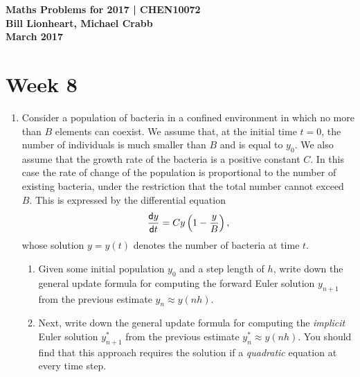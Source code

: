 \documentclass[11pt,a4paper]{article}
\newcommand{\dif}{\mathsf{d}}
\begin{document}
\begin{center} 
{\bf Maths Problems for 2017 | CHEN10072 \\
Bill Lionheart, Michael Crabb\\
 March 2017}
\end{center}

\section*{Week 8}

 \begin{enumerate}
\item \label{qdjsode1}
 Consider a population of bacteria in a confined environment in which no more than 
 $B$ elements can coexist. We assume that, at the initial time $t=0$, the number of individuals
 is  much smaller than $B$ and is equal to $y_0$. We also assume that
 the growth rate of the bacteria is a positive constant  $C$.
 In this case the rate of change of the population is proportional to the number
 of existing bacteria, under the restriction that the total number cannot exceed
 $B$. This is expressed by the differential equation 
 $${\dif y\over \dif t} = Cy \left( 1-{y\over B}\right),$$
 whose solution $y=y(t)$ denotes the number of bacteria at time $t$.
 
 \begin{enumerate}
\item 
Given some initial population $y_0$ and a  step length of $h$,
write down the general update formula for computing the forward Euler 
solution  $y_{n+1}$  from the previous estimate $y_n\approx y(nh)$.
\item 
Next, write down the general update formula for computing the {\it implicit} Euler 
solution  $y^*_{n+1}$  from the previous estimate $y^*_n \approx y(nh)$.
You should find that this approach requires the solution if a 
{\it quadratic} equation at every time step.  \end{enumerate}


\end{enumerate}
\end{document}

